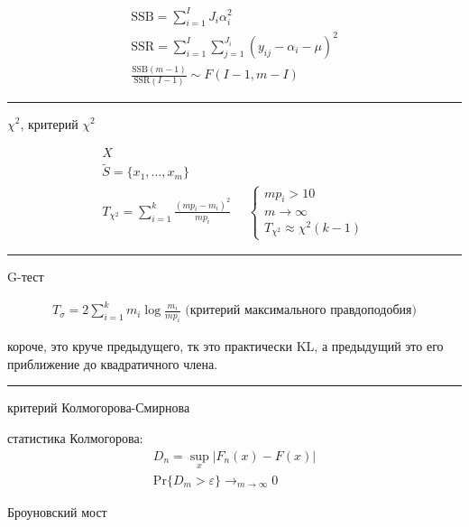 \documentclass{book}
\begin{document}
\begin{gather*}
  \mathrm{SSB}=\sum_{i=1}^{I} {J_i\alpha_i^2}\\
  \mathrm{SSR}=\sum_{i=1}^{I} \sum_{j=1}^{J_i} {(y_{ij}-\alpha_i-\mu)^2}\\
  \frac{\mathrm{SSB}(m-1)}{\mathrm{SSR}(I-1)} \sim F(I-1, m-I)
\end{gather*}


\hrule

$\chi^2$, критерий $\chi^2$

\begin{gather*}
  X\\
  \tilde{S}=\{x_1, \dots, x_m\}\\
  T_{\chi^2}=\sum_{i=1}^{k} {\frac{(mp_i-m_i)^2}{mp_i}}
  ~~~~~~
  \begin{cases}
      mp_i > 10\\
      m\rightarrow\infty\\
      T_{\chi^2} \approx \chi^2(k-1)
  \end{cases}
\end{gather*}

\hrule

G-тест

\begin{gather*}
  T_{\sigma}=2 \sum_{i=1}^{k} {m_i\log \frac{m_i}{mp_i}}\textrm{ (критерий максимального правдоподобия)}
\end{gather*}

короче, это круче предыдущего, тк это практически KL, а предыдущий это его приближение до квадратичного члена.

\hrule

критерий Колмогорова-Смирнова

статистика Колмогорова:
\begin{gather*}
    D_n=\sup_x |F_n(x)-F(x)|\\
    \mathrm{Pr}\{D_m>\varepsilon\} \rightarrow_{m\rightarrow\infty} 0
\end{gather*}


Броуновский мост
\end{document}
